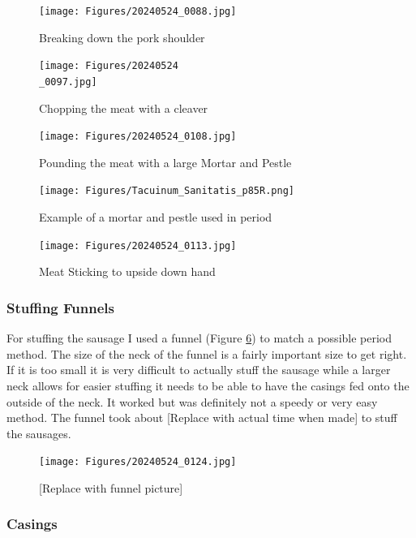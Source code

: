 \documentclass[letterpaper,11pt,leqno]{article}
\begin{document}
 \begin{figure}[!htb]
	\centering
	\texttt{[image: Figures/20240524\_0088.jpg]}
	\caption{Breaking down the pork shoulder}
	\label{Breakdown}
\end{figure}
 \begin{figure}[!htb]
	\centering
	\texttt{[image: Figures/20240524\\\_0097.jpg]}
	\caption{Chopping the meat with a cleaver}
	\label{Chopping}
\end{figure}
 \begin{figure}[!htb]
	\centering
	\texttt{[image: Figures/20240524\_0108.jpg]}
	\caption{Pounding the meat with a large Mortar and Pestle}
	\label{MortarPestle}
\end{figure}
\begin{figure}[!htb]
\centering
\texttt{[image: Figures/Tacuinum\_Sanitatis\_p85R.png]}
\caption{Example of a mortar and pestle used in period \citep{TacSan}}
\label{MortarIlumination}
\end{figure}
 \begin{figure}[!htb]
	\centering
	\texttt{[image: Figures/20240524\_0113.jpg]}
	\caption{Meat Sticking to upside down hand}
	\label{sticking}
\end{figure}

\FloatBarrier

\subsubsection{Stuffing Funnels}

For stuffing the sausage I used a funnel (Figure \ref{stuffer}) to match a possible period method. The size of the neck of the funnel is a fairly important size to get right. If it is too small it is very difficult to actually stuff the sausage while a larger neck allows for easier stuffing it needs to be able to have the casings fed onto the outside of the neck. It worked but was definitely not a speedy or very easy method. The funnel  took about [Replace with actual time when made] to stuff the sausages.

\begin{figure}[!htb]
	\centering
	\texttt{[image: Figures/20240524\_0124.jpg]}
	\caption{[Replace with funnel picture]}
	\label{stuffer}
\end{figure}

\subsubsection{Casings}
\end{document}
